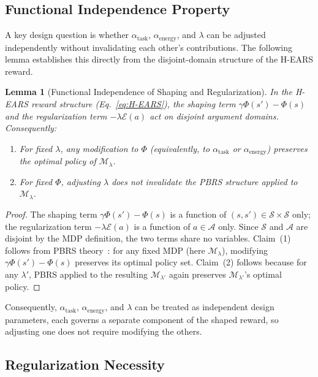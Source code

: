 \documentclass[journal]{IEEEtran}
\newtheorem{lemma}[theorem]{Lemma}
\begin{document}
	\subsection{Functional Independence Property}
	
	A key design question is whether $\alpha_{\text{task}}$, $\alpha_{\text{energy}}$, and $\lambda$ can be adjusted independently without invalidating each other's contributions. The following lemma establishes this directly from the disjoint-domain structure of the H-EARS reward.
	
	\begin{lemma}[Functional Independence of Shaping and Regularization]
		\label{lem:functional_independence}
		In the H-EARS reward structure (Eq.~\eqref{eq:H-EARS}), the shaping term $\gamma\Phi(s')-\Phi(s)$ and the regularization term $-\lambda\mathcal{E}(a)$ act on disjoint argument domains. Consequently:
		\begin{enumerate}
			\item For fixed $\lambda$, any modification to $\Phi$ (equivalently, to $\alpha_{\text{task}}$ or $\alpha_{\text{energy}}$) preserves the optimal policy of $\mathcal{M}_\lambda$.
			\item For fixed $\Phi$, adjusting $\lambda$ does not invalidate the PBRS structure applied to $\mathcal{M}_\lambda$.
		\end{enumerate}
	\end{lemma}
	
	\begin{proof}
		The shaping term $\gamma\Phi(s')-\Phi(s)$ is a function of $(s,s')\in\mathcal{S}\times\mathcal{S}$ only; the regularization term $-\lambda\mathcal{E}(a)$ is a function of $a\in\mathcal{A}$ only. Since $\mathcal{S}$ and $\mathcal{A}$ are disjoint by the MDP definition, the two terms share no variables. Claim~(1) follows from PBRS theory~\cite{ng1999policy}: for any fixed MDP (here $\mathcal{M}_\lambda$), modifying $\gamma\Phi(s')-\Phi(s)$ preserves its optimal policy set. Claim~(2) follows because for any $\lambda'$, PBRS applied to the resulting $\mathcal{M}_{\lambda'}$ again preserves $\mathcal{M}_{\lambda'}$'s optimal policy.
	\end{proof}
	
	Consequently, $\alpha_{\text{task}}$, $\alpha_{\text{energy}}$, and $\lambda$ can be treated as independent design parameters, each governs a separate component of the shaped reward, so adjusting one does not require modifying the others.
	
	\subsection{Regularization Necessity}
	
\end{document}
